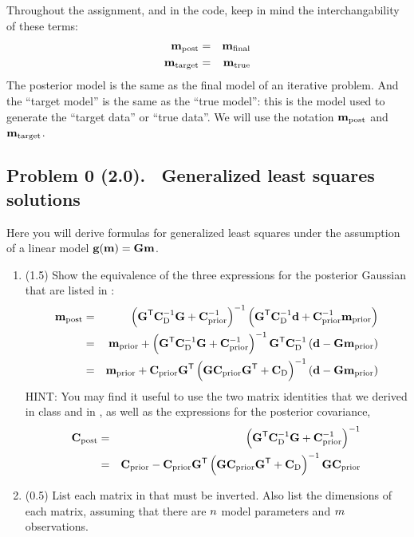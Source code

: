 \documentclass[11pt,titlepage,fleqn]{article}
\begin{document}
Throughout the assignment, and in the code, keep in mind the interchangability of these terms:
%
\begin{eqnarray*}
\mbox{${\bf m}$}_{\rm post} &=& \mbox{${\bf m}$}_{\rm final}
\\
\mbox{${\bf m}$}_{\rm target} &=& \mbox{${\bf m}$}_{\rm true}
\end{eqnarray*}
%
The posterior model is the same as the final model of an iterative problem. And the ``target model'' is the same as the ``true model'': this is the model used to generate the ``target data'' or ``true data''. We will use the notation $\mbox{${\bf m}$}_{\rm post}$ and $\mbox{${\bf m}$}_{\rm target}$.



\pagebreak
\subsection*{Problem 0 (2.0). \ptag\ Generalized least squares solutions}

Here you will derive formulas for generalized least squares under the assumption of a linear model $\mbox{${\bf g}$}(\mbox{${\bf m}$}) = \mbox{${\bf G}$}\mbox{${\bf m}$}$.
%
\begin{enumerate}
\item (1.5) Show the equivalence of the three expressions for the posterior Gaussian that are listed in \citet[][p.~66]{Tarantola2005}:
%
\begin{eqnarray}
\mpost &=& \left(\bG^{\tssT} \covdi \bG + \cpriori \right)^{-1}
\left( \bG^{\tssT} \covdi \bd + \cpriori\mprior \right)
\label{mpost1}
\\
&=& \mprior + \left(\bG^{\tssT} \covdi \bG + \cpriori \right)^{-1} \bG^{\tssT} \covdi \left( \bd - \bG \mprior\right)
\label{mpost2}
\\
&=& \mprior + \cprior \bG^{\tssT} \left( \bG \cprior \bG^{\tssT} + \Cd\right)^{-1} \left( \bd - \bG \mprior\right)
\label{mpost3}
\end{eqnarray}
%
HINT: You may find it useful to use the two matrix identities that we derived in class and in \citet[][Eq.~6.525]{Tarantola2005}, as well as the expressions for the posterior covariance,
%
\begin{eqnarray}
\cpost &=& \left(\bG^{\tssT} \covdi \bG + \cpriori \right)^{-1}
\label{cpost1}
\\
&=& \cprior - \cprior \bG^{\tssT} \left( \bG \cprior \bG^{\tssT} + \covd \right)^{-1} \bG \cprior
\label{cpost2}
\end{eqnarray}

\item (0.5) List each matrix in  that must be inverted. Also list the dimensions of each matrix, assuming that there are $n$ model parameters and $m$ observations.
\end{enumerate}
\end{document}

